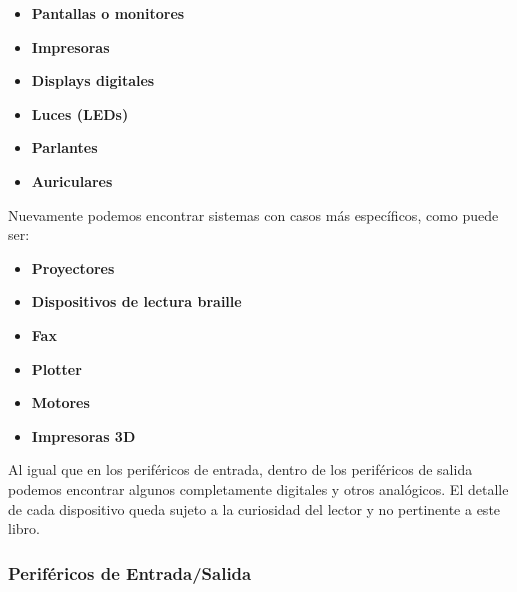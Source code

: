 \begin{minipage}{0.45\textwidth}
    \begin{itemize}
        \item \textbf{Pantallas o monitores}
        \item \textbf{Impresoras}
        \item \textbf{Displays digitales}
    \end{itemize}
\end{minipage}
\begin{minipage}{0.45\textwidth}
    \begin{itemize}
        \item \textbf{Luces (LEDs)}
        \item \textbf{Parlantes}
        \item \textbf{Auriculares}
    \end{itemize}
\end{minipage}

Nuevamente podemos encontrar sistemas con casos más específicos, como puede ser:

\begin{minipage}{0.45\textwidth}
    \begin{itemize}
        \item \textbf{Proyectores}
        \item \textbf{Dispositivos de lectura braille}
        \item \textbf{Fax}
    \end{itemize}
\end{minipage}
\begin{minipage}{0.45\textwidth}
    \begin{itemize}
        \item \textbf{Plotter}
        \item \textbf{Motores}
        \item \textbf{Impresoras 3D}
    \end{itemize}
\end{minipage}

Al igual que en los periféricos de entrada, dentro de los periféricos de salida
podemos encontrar algunos completamente digitales y otros analógicos. El detalle
de cada dispositivo queda sujeto a la curiosidad del lector y no pertinente a
este libro.

\subsubsection*{Periféricos de Entrada/Salida}
\label{chap:computadoras:subsubsec:perifericos_entrada_salida}

